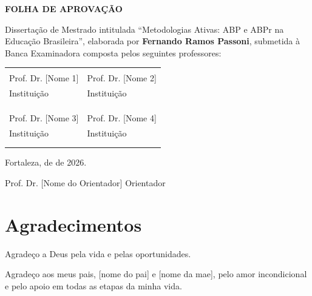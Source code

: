 \documentclass[12pt,a4paper,twoside,openright]{book}
\newcommand{\autordissertacao}{Fernando Ramos Passoni}
\newcommand{\nomedissertacao}{Metodologias Ativas: ABP e ABPr na Educação Brasileira}
\newcommand{\orientador}{Prof. Dr. [Nome do Orientador]}
\newcommand{\cidadedefesa}{Fortaleza}
\newcommand{\anodefesa}{2026}
\newcommand{\nomepai}[1]{[nome do pai]}
\newcommand{\nomemae}[1]{[nome da mae]}
\begin{document}
\thispagestyle{empty}
\vspace*{3cm}
\begin{center}
{\large\textbf{FOLHA DE APROVAÇÃO}}
\end{center}

\vspace{2cm}

Dissertação de Mestrado intitulada ``\nomedissertacao{}'', elaborada por \textbf{\autordissertacao{}}, submetida à Banca Examinadora composta pelos seguintes professores:

\vspace{1cm}

\begin{tabular}{p{}p{}}
\hrulefill & \hrulefill \\
Prof. Dr. [Nome 1] & Prof. Dr. [Nome 2] \\
Instituição & Instituição \\
& \\
& \\
\hrulefill & \hrulefill \\
Prof. Dr. [Nome 3] & Prof. Dr. [Nome 4] \\
Instituição & Instituição \\
& \\
& \\
\end{tabular}

\vspace{2cm}

\begin{center}
\cidadedefesa{}, \underline{\hspace{2cm}} de \underline{\hspace{2cm}} de \anodefesa{}.

\vspace{1cm}
\noindent\hrulefill

\orientador{}
Orientador
\end{center}

\newpage

\thispagestyle{empty}
\chapter*{Agradecimentos}

Agradeço a Deus pela vida e pelas oportunidades.

Agradeço aos meus pais, \nomepai{} e \nomemae{}, pelo amor incondicional e pelo apoio em todas as etapas da minha vida.
\end{document}
